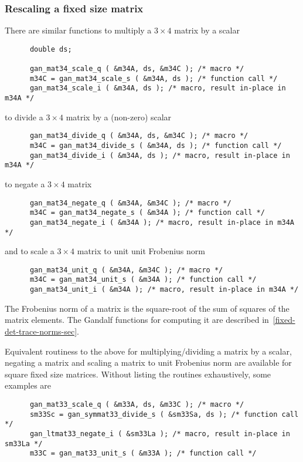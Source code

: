 \subsubsection{Rescaling a fixed size matrix}
There are similar functions to multiply a $3\times 4$ matrix by a scalar
\begin{verbatim}
      double ds;

      gan_mat34_scale_q ( &m34A, ds, &m34C ); /* macro */
      m34C = gan_mat34_scale_s ( &m34A, ds ); /* function call */
      gan_mat34_scale_i ( &m34A, ds ); /* macro, result in-place in m34A */
\end{verbatim}
to divide a $3\times 4$ matrix by a (non-zero) scalar
\begin{verbatim}
      gan_mat34_divide_q ( &m34A, ds, &m34C ); /* macro */
      m34C = gan_mat34_divide_s ( &m34A, ds ); /* function call */
      gan_mat34_divide_i ( &m34A, ds ); /* macro, result in-place in m34A */
\end{verbatim}
to negate a $3\times 4$ matrix
\begin{verbatim}
      gan_mat34_negate_q ( &m34A, &m34C ); /* macro */
      m34C = gan_mat34_negate_s ( &m34A ); /* function call */
      gan_mat34_negate_i ( &m34A ); /* macro, result in-place in m34A */
\end{verbatim}
and to scale a $3\times 4$ matrix to unit unit Frobenius norm
\begin{verbatim}
      gan_mat34_unit_q ( &m34A, &m34C ); /* macro */
      m34C = gan_mat34_unit_s ( &m34A ); /* function call */
      gan_mat34_unit_i ( &m34A ); /* macro, result in-place in m34A */
\end{verbatim}
The Frobenius norm of a matrix is the square-root of the sum of squares
of the matrix elements. The Gandalf functions for computing it are
described in~\ref{fixed-det-trace-norms-sec}.

Equivalent routiness to the above for multiplying/dividing a matrix by a
scalar, negating a matrix and scaling a matrix to unit Frobenius norm are
available for square fixed size matrices. Without listing the routines
exhaustively, some examples are
\begin{verbatim}
      gan_mat33_scale_q ( &m33A, ds, &m33C ); /* macro */
      sm33Sc = gan_symmat33_divide_s ( &sm33Sa, ds ); /* function call */
      gan_ltmat33_negate_i ( &sm33La ); /* macro, result in-place in sm33La */
      m33C = gan_mat33_unit_s ( &m33A ); /* function call */
\end{verbatim}

